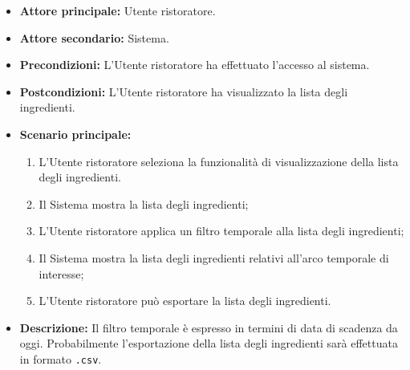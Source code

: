 \label{usecase:Consulta lista degli ingredienti}
\begin{itemize}
	\item \textbf{Attore principale:} Utente ristoratore.

	\item \textbf{Attore secondario:} Sistema.

	\item \textbf{Precondizioni:}
	      L'Utente ristoratore ha effettuato l'accesso al sistema.

	\item \textbf{Postcondizioni:}
	      L'Utente ristoratore ha visualizzato la lista degli ingredienti.

	\item \textbf{Scenario principale:}
	      \begin{enumerate}
		      \item L'Utente ristoratore seleziona la funzionalità di
		            visualizzazione della lista degli ingredienti.

		      \item Il Sistema mostra la lista degli ingredienti;

		      \item L'Utente ristoratore applica un filtro temporale alla lista
		            degli ingredienti;

		      \item Il Sistema mostra la lista degli ingredienti
		            relativi all'arco temporale di interesse;

		      \item L'Utente ristoratore può esportare la lista degli
		            ingredienti.
	      \end{enumerate}

	\item \textbf{Descrizione:}
	      Il filtro temporale è espresso in termini di data di scadenza da oggi.
	      Probabilmente l'esportazione della lista degli ingredienti sarà
	      effettuata in formato \texttt{.csv}.
\end{itemize}
